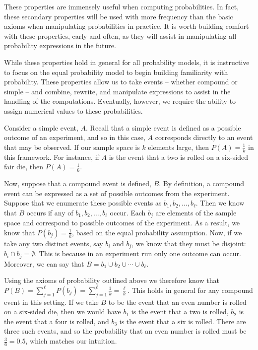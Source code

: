 \documentclass[
  letterpaper,
  DIV=11,
  numbers=noendperiod]{scrreprt}
\theoremstyle{definition}
\theoremstyle{definition}
\theoremstyle{definition}
\theoremstyle{remark}
\begin{document}
These properties are immensely useful when computing probabilities. In
fact, these secondary properties will be used with more frequency than
the basic axioms when manipulating probabilities in practice. It is
worth building comfort with these properties, early and often, as they
will assist in manipulating all probability expressions in the future.

While these properties hold in general for all probability models, it is
instructive to focus on the equal probability model to begin building
familiarity with probability. These properties allow us to take events
-- whether compound or simple -- and combine, rewrite, and manipulate
expressions to assist in the handling of the computations. Eventually,
however, we require the ability to assign numerical values to these
probabilities.

Consider a simple event, \(A\). Recall that a simple event is defined as
a possible outcome of an experiment, and so in this case, \(A\)
corresponds directly to an event that may be observed. If our sample
space is \(k\) elements large, then \(P(A) = \frac{1}{k}\) in this
framework. For instance, if \(A\) is the event that a two is rolled on a
six-sided fair die, then \(P(A) = \frac{1}{6}\).

Now, suppose that a compound event is defined, \(B\). By definition, a
compound event can be expressed as a set of possible outcomes from the
experiment. Suppose that we enumerate these possible events as
\(b_1, b_2, \dots, b_\ell\). Then we know that \(B\) occurs if any of
\(b_1,b_2,\dots,b_\ell\) occur. Each \(b_j\) are elements of the sample
space and correspond to possible outcomes of the experiment. As a
result, we know that \(P(b_j) = \frac{1}{k}\), based on the equal
probability assumption. Now, if we take any two distinct events, say
\(b_i\) and \(b_j\), we know that they must be disjoint:
\(b_i \cap b_j = \emptyset\). This is because in an experiment run only
one outcome can occur. Moreover, we can say that
\(B = b_1 \cup b_2 \cup\cdots\cup b_\ell\).

Using the axioms of probability outlined above we therefore know that
\(P(B) = \sum_{j=1}^\ell P(b_j) = \sum_{j=1}^\ell \frac{1}{k} = \frac{\ell}{k}\).
This holds in general for any compound event in this setting. If we take
\(B\) to be the event that an even number is rolled on a six-sided die,
then we would have \(b_1\) is the event that a two is rolled, \(b_2\) is
the event that a four is rolled, and \(b_3\) is the event that a six is
rolled. There are three such events, and so the probability that an even
number is rolled must be \(\frac{3}{6} = 0.5\), which matches our
intuition.
\end{document}
